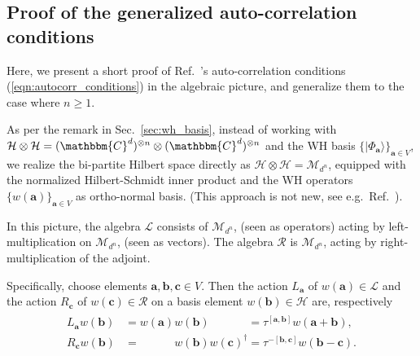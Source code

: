 \documentclass[aps,nofootinbib,floatfix,a4paper]{revtex4}
\newcommand{\1}{\mbox{$\mathbf{1}$}}
\def\CC{\mathbbm{C}}
\def\H{\mathcal{H}}
\def\M{\mathcal{M}}
\renewcommand{\vec}{\mathbf}
\begin{document}
\subsection{Proof of the generalized auto-correlation conditions}
\label{sec:auto_proof}

Here, we present a short proof of Ref.~\cite{Rather2024Construction}'s auto-correlation conditions (\ref{eqn:autocorr_conditions}) in the algebraic picture, and generalize them to the case where $n\geq 1$.

%
As per the remark in Sec.~\ref{sec:wh_basis}, 
instead of working with 
$\H\otimes\H=(\CC^d)^{\otimes n}\otimes(\CC^d)^{\otimes n}$
and the WH basis $\{|\Phi_{\vec a}\rangle\}_{\vec a \in V}$,
we realize the bi-partite Hilbert space directly as 
$\H\otimes\H=\M_{d^n}$,
equipped with the normalized Hilbert-Schmidt inner product and the WH operators $\{w(\vec a)\}_{\vec a\in V}$ as ortho-normal basis.
(This approach is not new, see e.g.\ Ref.~\cite{tyson2003operator}).

In this picture, the algebra $\mathcal{L}$ consists of $\M_{d^n}$, (seen as operators) acting by left-multiplication on $\M_{d^n}$, (seen as vectors).
The algebra $\mathcal{R}$ is $\M_{d^n}$, acting by right-multiplication of the adjoint.

Specifically, choose elements $\vec a, \vec b, \vec c\in V$.
Then the action $L_{\vec a}$ of $w({\vec a})\in\mathcal{L}$ 
and the action $R_{\vec c}$ of $w({\vec c})\in\mathcal{R}$ on a basis element $w(\vec b)\in\H$ are, respectively
\begin{align}
	\begin{split}\label{eqn:wh_action}
		L_{\vec a} w(\vec b) &= w({\vec a}) w(\vec b)\phantom{w(\vec c)^\dagger} = \tau^{[{\vec a},\vec b]} w({\vec a}+\vec b), \\
		R_{\vec c} w(\vec b) &= \phantom{w(\vec a)}w(\vec b) w({\vec c})^\dagger = \tau^{-[\vec b,{\vec c}]} w(\vec b-{\vec c}).
	\end{split}
\end{align}
\end{document}
